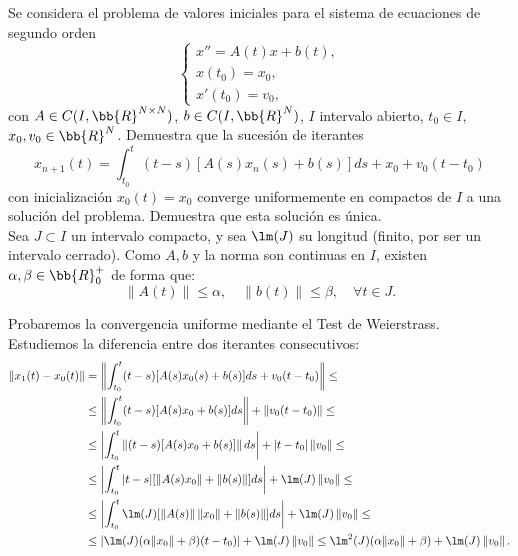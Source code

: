 \begin{ejercicio}\label{ej:5.2}
    Se considera el problema de valores iniciales para el sistema de ecuaciones de segundo orden
    \[
        \begin{cases}
            x'' = A(t)x + b(t),\\
            x(t_0) = x_0,\\
            x'(t_0) = v_0,
        \end{cases}
    \]
    con $A \in C(I, \bb{R}^{N\times N})$, $b \in C(I, \bb{R}^N)$, $I$ intervalo abierto, $t_0 \in I$, $x_0, v_0 \in \bb{R}^N$. Demuestra que la sucesión de iterantes
    \[
        x_{n+1}(t) = \int_{t_0}^t (t - s)[A(s)x_n(s) + b(s)]ds + x_0 + v_0(t - t_0)
    \]
    con inicialización $x_0(t) = x_0$ converge uniformemente en compactos de $I$ a una solución del problema. Demuestra que esta solución es única.\\

    Sea $J\subset I$ un intervalo compacto, y sea $\lm(J)$ su longitud (finito, por ser un intervalo cerrado). Como $A,b$ y la norma son continuas en $I$, existen $\alpha,\beta\in \bb{R}^+_0$ de forma que:
    \begin{equation*}
        \|A(t)\|\leq \alpha,\quad \|b(t)\|\leq \beta,\quad \forall t\in J.
    \end{equation*}

    Probaremos la convergencia uniforme mediante el Test de Weierstrass. Estudiemos la diferencia entre dos iterantes consecutivos:
    \begin{align*}
        \|x_1(t) - x_0(t)\| &= \left\|\int_{t_0}^t (t - s)[A(s)x_0(s) + b(s)]ds  + v_0(t - t_0)\right\|
        \leq\\ &\leq 
        \left\|\int_{t_0}^t (t - s)[A(s)x_0 + b(s)]ds\right\|  + \left\|v_0(t - t_0)\right\|
        \leq\\ &\leq 
        \left|\int_{t_0}^t \left\|(t - s)[A(s)x_0 + b(s)]\right\|ds\right|  + |t - t_0|\left\|v_0\right\|
        \leq\\ &\leq 
        \left|\int_{t_0}^t |t-s|[\left\|A(s)x_0\right\| + \left\|b(s)\right\|]ds\right|  + \lm(J)\left\|v_0\right\|
        \leq\\ &\leq 
        \left|\int_{t_0}^t \lm(J)[\left\|A(s)\right\|\left\|x_0\right\| + \left\|b(s)\right\|]ds\right|  + \lm(J)\left\|v_0\right\|
        \leq\\ &\leq 
        \left|\lm(J)(\alpha\|x_0\|+\beta)(t-t_0)\right|  + \lm(J)\left\|v_0\right\|
        \leq \lm^2(J)(\alpha\|x_0\|+\beta)+ \lm(J)\left\|v_0\right\|.
    \end{align*}


\end{ejercicio}
